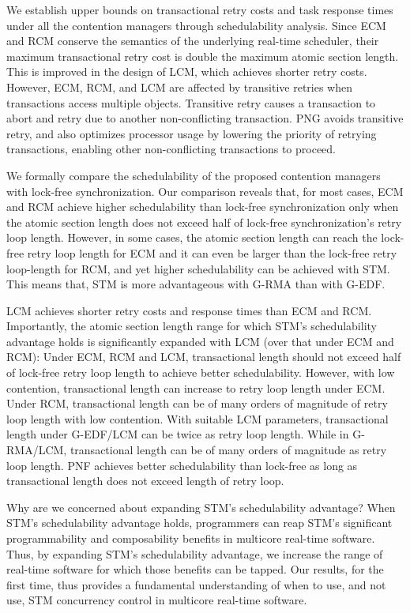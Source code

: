 \documentclass[12pt,english]{report}
\begin{document}
We establish upper bounds on transactional retry costs and task response times under all the contention managers through schedulability analysis.   Since ECM and RCM conserve the semantics of the underlying real-time scheduler, their maximum transactional retry cost is double the maximum atomic section length. This is improved in the design of LCM, which achieves  shorter retry costs.  However, ECM, RCM, and LCM are affected by transitive retries when transactions access multiple objects. 
Transitive retry causes a transaction to abort and retry due to another non-conflicting transaction. PNG avoids transitive retry, and also optimizes processor usage by lowering the priority of retrying transactions, enabling other non-conflicting transactions to proceed. 

We formally compare the schedulability of the proposed contention managers with lock-free synchronization. 
Our comparison reveals that, for most cases, ECM and RCM achieve higher schedulability than lock-free synchronization only when the atomic section length does not exceed half of lock-free synchronization's retry loop length. However, in some cases, the atomic section length can reach the lock-free retry loop length for ECM and it can even be larger than the lock-free retry loop-length for RCM, and yet higher schedulability can be achieved with STM. This means that, STM is more advantageous with G-RMA than with G-EDF. 

LCM achieves shorter retry costs and response times than ECM and RCM. Importantly, the atomic section length range for which STM's schedulability advantage holds is significantly expanded with LCM (over that under ECM and RCM): Under ECM, RCM and LCM, transactional length should not exceed half of lock-free retry loop length to achieve better schedulability. However, with low contention, transactional length can increase to retry loop length under ECM. Under RCM, transactional length can be of many orders of magnitude of retry loop length with low contention. With suitable LCM parameters, transactional length under G-EDF/LCM can be twice as retry loop length. While in G-RMA/LCM, transactional length can be of many orders of magnitude as retry loop length. PNF achieves better schedulability than lock-free as long as transactional length does not exceed length of retry loop.

Why are we concerned about expanding STM's schedulability advantage? When STM's schedulability advantage holds, programmers can reap STM's significant programmability and composability benefits in multicore real-time software. Thus, by expanding STM's schedulability advantage, we increase the range of real-time software for which those benefits can be tapped. Our results, for the first time, thus provides a fundamental understanding of when to use, and not use, STM concurrency control in multicore real-time software.
\end{document}

